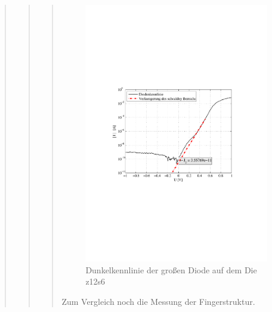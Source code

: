 \begin{quote}
\begin{quote}
\begin{quote}
            \begin{figure}[H]
                \centering
                \includegraphics[scale=0.7, trim = 3.1cm 9.2cm 4cm 8.5cm, clip]{KennlinienBilder/dunkel_kennlinie_z12_s6.pdf}
                \caption{Dunkelkennlinie der großen Diode auf dem Die z12s6}
                \label{fig:dunkel_kennlinie_z12_s6.pdf}
            \end{figure}


            Zum Vergleich noch die Messung der Fingerstruktur.


\end{quote}
\end{quote}
\end{quote}
